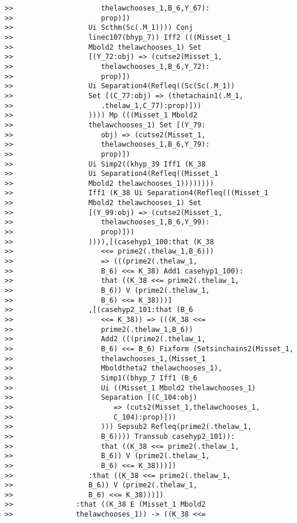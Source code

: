 \documentclass[12pt]{article}
\begin{document}
\begin{verbatim}
>>                     thelawchooses_1,B_6,Y_67):
>>                     prop)])
>>                  Ui Scthm(Sc(.M_1)))) Conj
>>                  linec107(bhyp_7)) Iff2 (((Misset_1
>>                  Mbold2 thelawchooses_1) Set
>>                  [(Y_72:obj) => (cutse2(Misset_1,
>>                     thelawchooses_1,B_6,Y_72):
>>                     prop)])
>>                  Ui Separation4(Refleq((Sc(Sc(.M_1))
>>                  Set [(C_77:obj) => (thetachain1(.M_1,
>>                     .thelaw_1,C_77):prop)]))
>>                  )))) Mp (((Misset_1 Mbold2
>>                  thelawchooses_1) Set [(Y_79:
>>                     obj) => (cutse2(Misset_1,
>>                     thelawchooses_1,B_6,Y_79):
>>                     prop)])
>>                  Ui Simp2((khyp_39 Iff1 (K_38
>>                  Ui Separation4(Refleq((Misset_1
>>                  Mbold2 thelawchooses_1))))))))
>>                  Iff1 (K_38 Ui Separation4(Refleq(((Misset_1
>>                  Mbold2 thelawchooses_1) Set
>>                  [(Y_99:obj) => (cutse2(Misset_1,
>>                     thelawchooses_1,B_6,Y_99):
>>                     prop)]))
>>                  )))),[(casehyp1_100:that (K_38
>>                     <<= prime2(.thelaw_1,B_6)))
>>                     => (((prime2(.thelaw_1,
>>                     B_6) <<= K_38) Add1 casehyp1_100):
>>                     that ((K_38 <<= prime2(.thelaw_1,
>>                     B_6)) V (prime2(.thelaw_1,
>>                     B_6) <<= K_38)))]
>>                  ,[(casehyp2_101:that (B_6
>>                     <<= K_38)) => (((K_38 <<=
>>                     prime2(.thelaw_1,B_6))
>>                     Add2 (((prime2(.thelaw_1,
>>                     B_6) <<= B_6) Fixform (Setsinchains2(Misset_1,
>>                     thelawchooses_1,(Misset_1
>>                     Mboldtheta2 thelawchooses_1),
>>                     Simp1((bhyp_7 Iff1 (B_6
>>                     Ui ((Misset_1 Mbold2 thelawchooses_1)
>>                     Separation [(C_104:obj)
>>                        => (cuts2(Misset_1,thelawchooses_1,
>>                        C_104):prop)]))
>>                     ))) Sepsub2 Refleq(prime2(.thelaw_1,
>>                     B_6)))) Transsub casehyp2_101)):
>>                     that ((K_38 <<= prime2(.thelaw_1,
>>                     B_6)) V (prime2(.thelaw_1,
>>                     B_6) <<= K_38)))])
>>                  :that ((K_38 <<= prime2(.thelaw_1,
>>                  B_6)) V (prime2(.thelaw_1,
>>                  B_6) <<= K_38)))])
>>               :that ((K_38 E (Misset_1 Mbold2
>>               thelawchooses_1)) -> ((K_38 <<=

\end{verbatim}
\end{document}
